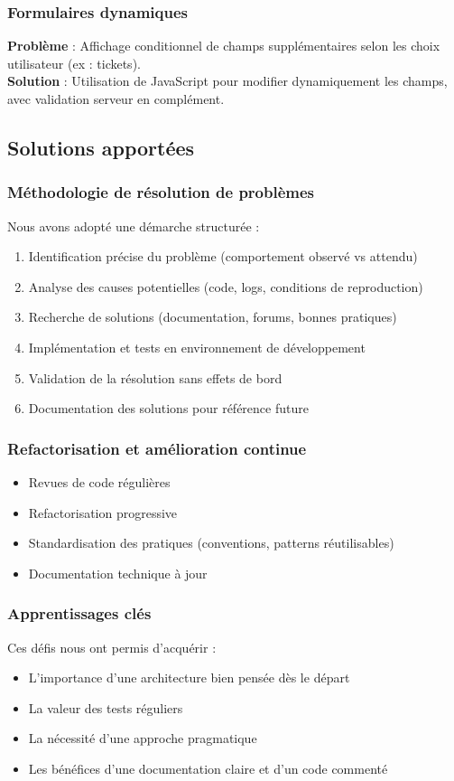 \documentclass[a4paper,12pt]{article}
\begin{document}
\subsubsection{Formulaires dynamiques}
\textbf{Problème} : Affichage conditionnel de champs supplémentaires selon les choix utilisateur (ex : tickets).\\
\textbf{Solution} : Utilisation de JavaScript pour modifier dynamiquement les champs, avec validation serveur en complément.

\subsection{Solutions apportées}

\subsubsection{Méthodologie de résolution de problèmes}
Nous avons adopté une démarche structurée :
\begin{enumerate}
  \item Identification précise du problème (comportement observé vs attendu)
  \item Analyse des causes potentielles (code, logs, conditions de reproduction)
  \item Recherche de solutions (documentation, forums, bonnes pratiques)
  \item Implémentation et tests en environnement de développement
  \item Validation de la résolution sans effets de bord
  \item Documentation des solutions pour référence future
\end{enumerate}

\subsubsection{Refactorisation et amélioration continue}
\begin{itemize}
  \item Revues de code régulières
  \item Refactorisation progressive
  \item Standardisation des pratiques (conventions, patterns réutilisables)
  \item Documentation technique à jour
\end{itemize}

\subsubsection{Apprentissages clés}
Ces défis nous ont permis d’acquérir :
\begin{itemize}
  \item L’importance d’une architecture bien pensée dès le départ
  \item La valeur des tests réguliers
  \item La nécessité d’une approche pragmatique
  \item Les bénéfices d’une documentation claire et d’un code commenté
\end{itemize}
\end{document}

